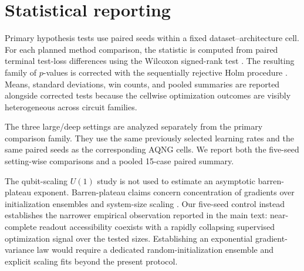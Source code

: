 \section{Statistical reporting}
\label{sec:statistics}

Primary hypothesis tests use paired seeds within a fixed dataset--architecture cell. For each planned method comparison, the statistic is computed from paired terminal test-loss differences using the Wilcoxon signed-rank test \cite{Wilcoxon1945}. The resulting family of $p$-values is corrected with the sequentially rejective Holm procedure \cite{Holm1979}. Means, standard deviations, win counts, and pooled summaries are reported alongside corrected tests because the cellwise optimization outcomes are visibly heterogeneous across circuit families.

The three large/deep settings are analyzed separately from the primary comparison family. They use the same previously selected learning rates and the same paired seeds as the corresponding AQNG cells. We report both the five-seed setting-wise comparisons and a pooled 15-case paired summary.

The qubit-scaling $U(1)$ study is not used to estimate an asymptotic barren-plateau exponent. Barren-plateau claims concern concentration of gradients over initialization ensembles and system-size scaling \cite{McClean2018}. Our five-seed control instead establishes the narrower empirical observation reported in the main text: near-complete readout accessibility coexists with a rapidly collapsing supervised optimization signal over the tested sizes. Establishing an exponential gradient-variance law would require a dedicated random-initialization ensemble and explicit scaling fits beyond the present protocol.
